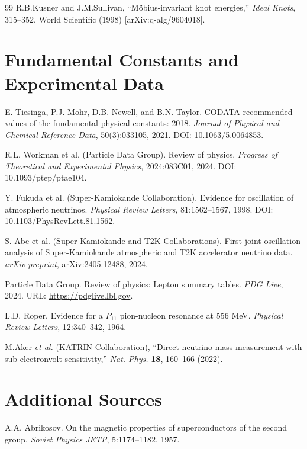 \documentclass[11pt,a4paper]{article}
\begin{document}
\begin{thebibliography}{99}
	 R.B.Kusner and J.M.Sullivan, ``Möbius-invariant knot energies,''
	\textit{Ideal Knots}, 315--352, World Scientific (1998) [arXiv:q-alg/9604018].
	
	\section*{Fundamental Constants and Experimental Data}
	
	E. Tiesinga, P.J. Mohr, D.B. Newell, and B.N. Taylor.
	\newblock CODATA recommended values of the fundamental physical constants: 2018.
	\newblock \textit{Journal of Physical and Chemical Reference Data}, 50(3):033105, 2021.
	\newblock DOI: 10.1063/5.0064853.
	
	R.L. Workman et al. (Particle Data Group).
	\newblock Review of physics.
	\newblock \textit{Progress of Theoretical and Experimental Physics}, 2024:083C01, 2024.
	\newblock DOI: 10.1093/ptep/ptae104.
	
	Y. Fukuda et al. (Super-Kamiokande Collaboration).
	\newblock Evidence for oscillation of atmospheric neutrinos.
	\newblock \textit{Physical Review Letters}, 81:1562--1567, 1998.
	\newblock DOI: 10.1103/PhysRevLett.81.1562.
	
	S. Abe et al. (Super-Kamiokande and T2K Collaborations).
	\newblock First joint oscillation analysis of Super-Kamiokande atmospheric and T2K accelerator neutrino data.
	\newblock \textit{arXiv preprint}, arXiv:2405.12488, 2024.
	
	Particle Data Group.
	 Review of physics: Lepton summary tables.
	\newblock \textit{PDG Live}, 2024.
	\newblock URL: \url{https://pdglive.lbl.gov}.
	
	L.D. Roper.
	\newblock Evidence for a $P_{11}$ pion-nucleon resonance at 556 MeV.
	\newblock \textit{Physical Review Letters}, 12:340--342, 1964.
	
	M.Aker \textit{et al.} (KATRIN Collaboration), ``Direct neutrino-mass measurement with sub-electronvolt sensitivity,'' \textit{Nat. Phys.} \textbf{18}, 160--166 (2022).
	
	\section*{Additional Sources}
	
	A.A. Abrikosov.
	\newblock On the magnetic properties of superconductors of the second group.
	\newblock \textit{Soviet Physics JETP}, 5:1174--1182, 1957.
	

\end{thebibliography}
\end{document}
